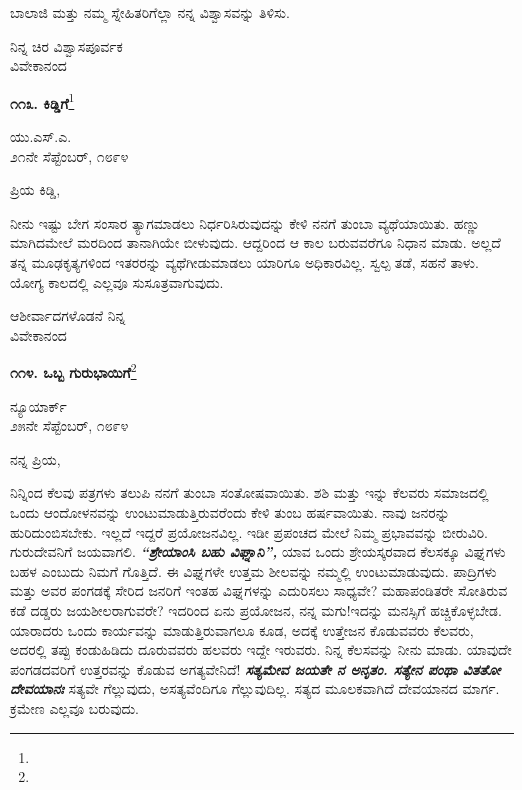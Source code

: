 ಬಾಲಾಜಿ ಮತ್ತು ನಮ್ಮ ಸ್ನೇಹಿತರಿಗೆಲ್ಲಾ ನನ್ನ ವಿಶ್ವಾಸವನ್ನು ತಿಳಿಸು.

{\flushright
ನಿನ್ನ ಚಿರ ವಿಶ್ವಾಸಪೂರ್ವಕ\\ವಿವೇಕಾನಂದ\par}

\begin{center}
\textbf{೧೧೩. ಕಿಡ್ಡಿಗೆ}\footnote{}
\end{center}

\vspace{-0.7cm}

\begin{flushright}
ಯು.ಎಸ್.ಎ.\\೨೧ನೇ ಸೆಪ್ಟೆಂಬರ್, ೧೮೯೪
\end{flushright}

\vspace{-0.7cm}

\noindent
ಪ್ರಿಯ ಕಿಡ್ಡಿ,

ನೀನು ಇಷ್ಟು ಬೇಗ ಸಂಸಾರ ತ್ಯಾಗಮಾಡಲು ನಿರ್ಧರಿಸಿರುವುದನ್ನು ಕೇಳಿ ನನಗೆ ತುಂಬಾ ವ್ಯಥೆಯಾಯಿತು. ಹಣ್ಣು ಮಾಗಿದಮೇಲೆ ಮರದಿಂದ ತಾನಾಗಿಯೇ ಬೀಳುವುದು. ಆದ್ದರಿಂದ ಆ ಕಾಲ ಬರುವವರೆಗೂ ನಿಧಾನ ಮಾಡು. ಅಲ್ಲದೆ ತನ್ನ ಮೂಢಕೃತ್ಯಗಳಿಂದ ಇತರರನ್ನು ವ್ಯಥೆಗೀಡುಮಾಡಲು ಯಾರಿಗೂ ಅಧಿಕಾರವಿಲ್ಲ. ಸ್ವಲ್ಪ ತಡೆ, ಸಹನೆ ತಾಳು. ಯೋಗ್ಯ ಕಾಲದಲ್ಲಿ ಎಲ್ಲವೂ ಸುಸೂತ್ರವಾಗುವುದು.

\vspace{-0.3cm}

{\flushright
ಆಶೀರ್ವಾದಗಳೊಡನೆ ನಿನ್ನ\\ವಿವೇಕಾನಂದ\par}

\begin{center}
\textbf{೧೧೪. ಒಬ್ಬ ಗುರುಭಾಯಿಗೆ}\footnote{}
\end{center}

\vspace{-0.7cm}

\begin{flushright}
ನ್ಯೂಯಾರ್ಕ್\\೨೫ನೇ ಸೆಪ್ಟೆಂಬರ್, ೧೮೯೪
\end{flushright}

\vspace{-0.7cm}

\noindent
ನನ್ನ ಪ್ರಿಯ,

ನಿನ್ನಿಂದ ಕೆಲವು ಪತ್ರಗಳು ತಲುಪಿ ನನಗೆ ತುಂಬಾ ಸಂತೋಷವಾಯಿತು. ಶಶಿ ಮತ್ತು ಇನ್ನು ಕೆಲವರು ಸಮಾಜದಲ್ಲಿ ಒಂದು ಆಂದೋಳನವನ್ನು ಉಂಟುಮಾಡುತ್ತಿರುವರೆಂದು ಕೇಳಿ ತುಂಬ ಹರ್ಷವಾಯಿತು. ನಾವು ಜನರನ್ನು ಹುರಿದುಂಬಿಸಬೇಕು. ಇಲ್ಲದೆ ಇದ್ದರೆ ಪ್ರಯೋಜನವಿಲ್ಲ. ಇಡೀ ಪ್ರಪಂಚದ ಮೇಲೆ ನಿಮ್ಮ ಪ್ರಭಾವವನ್ನು ಬೀರುವಿರಿ. ಗುರುದೇವನಿಗೆ ಜಯವಾಗಲಿ. \textbf{\textit{ “ಶ್ರೇಯಾಂಸಿ ಬಹು ವಿಘ್ನಾನಿ”, }} ಯಾವ ಒಂದು ಶ್ರೇಯಸ್ಕರ\enginline{-}\break ವಾದ ಕೆಲಸಕ್ಕೂ ವಿಘ್ನಗಳು ಬಹಳ ಎಂಬುದು ನಿಮಗೆ ಗೊತ್ತಿದೆ. ಈ ವಿಘ್ನಗಳೇ ಉತ್ತಮ ಶೀಲವನ್ನು ನಮ್ಮಲ್ಲಿ ಉಂಟುಮಾಡುವುದು. ಪಾದ್ರಿಗಳು ಮತ್ತು ಅವರ ಪಂಗಡಕ್ಕೆ ಸೇರಿದ ಜನರಿಗೆ ಇಂತಹ ವಿಘ್ನಗಳನ್ನು ಎದುರಿಸಲು ಸಾಧ್ಯವೇ? ಮಹಾಪಂಡಿತರೇ ಸೋತಿರುವ ಕಡೆ ದಡ್ಡರು ಜಯಶೀಲರಾಗುವರೇ? ಇದರಿಂದ ಏನು ಪ್ರಯೋಜನ, ನನ್ನ ಮಗು!ಇದನ್ನು ಮನಸ್ಸಿಗೆ ಹಚ್ಚಿಕೊಳ್ಳಬೇಡ. ಯಾರಾದರು ಒಂದು ಕಾರ್ಯವನ್ನು ಮಾಡುತ್ತಿರುವಾಗಲೂ ಕೂಡ, ಅದಕ್ಕೆ ಉತ್ತೇಜನ ಕೊಡುವವರು ಕೆಲವರು, ಅದರಲ್ಲಿ ತಪ್ಪು ಕಂಡುಹಿಡಿದು ದೂರುವವರು ಹಲವರು ಇದ್ದೇ ಇರುವರು. ನಿನ್ನ ಕೆಲಸವನ್ನು ನೀನು ಮಾಡು. ಯಾವುದೇ ಪಂಗಡದವರಿಗೆ ಉತ್ತರವನ್ನು ಕೊಡುವ ಅಗತ್ಯವೇನಿದೆ! \textbf{\textit{ಸತ್ಯಮೇವ ಜಯತೇ ನ ಅನೃತಂ. ಸತ್ಯೇನ ಪಂಥಾ ವಿತತೋ ದೇವಯಾನಃ}} \enginline{-}ಸತ್ಯವೇ ಗೆಲ್ಲುವುದು, ಅಸತ್ಯವೆಂದಿಗೂ ಗೆಲ್ಲುವುದಿಲ್ಲ. ಸತ್ಯದ ಮೂಲಕವಾಗಿದೆ ದೇವಯಾನದ ಮಾರ್ಗ. ಕ್ರಮೇಣ ಎಲ್ಲವೂ ಬರುವುದು.


